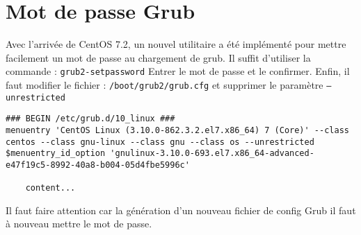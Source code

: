 \section{Mot de passe Grub}
Avec l'arrivée de CentOS 7.2, un nouvel utilitaire a été implémenté pour mettre facilement un mot de passe au chargement de grub.
Il suffit d'utiliser la commande : \texttt{grub2-setpassword}
Entrer le mot de passe et le confirmer.
Enfin, il faut modifier le fichier : \texttt{/boot/grub2/grub.cfg} et supprimer le paramètre \texttt{--unrestricted}
\begin{lstlisting}
### BEGIN /etc/grub.d/10_linux ###
menuentry 'CentOS Linux (3.10.0-862.3.2.el7.x86_64) 7 (Core)' --class centos --class gnu-linux --class gnu --class os --unrestricted $menuentry_id_option 'gnulinux-3.10.0-693.el7.x86_64-advanced-e47f19c5-8992-40a8-b004-05d4fbe5996c' 

	content...
\end{lstlisting}
Il faut faire attention car la génération d'un nouveau fichier de config Grub il faut à nouveau mettre le mot de passe.
